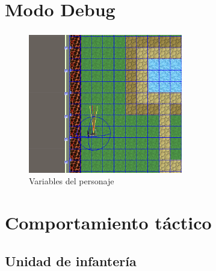 \documentclass[bigger]{beamer}
\begin{document}
\section{Modo Debug}

\begin{frame}[b]
\frametitle{\secname} %
\framesubtitle{} %
\rmfamily %
\color{black} %
\begin{figure}[b!]
    \centering
    \includegraphics[width=0.6\textwidth]{debug.png}
    \caption{Variables del personaje}
\end{figure}
\end{frame}

\section{Comportamiento táctico}

\subsection{Unidad de infantería}
\end{document}
